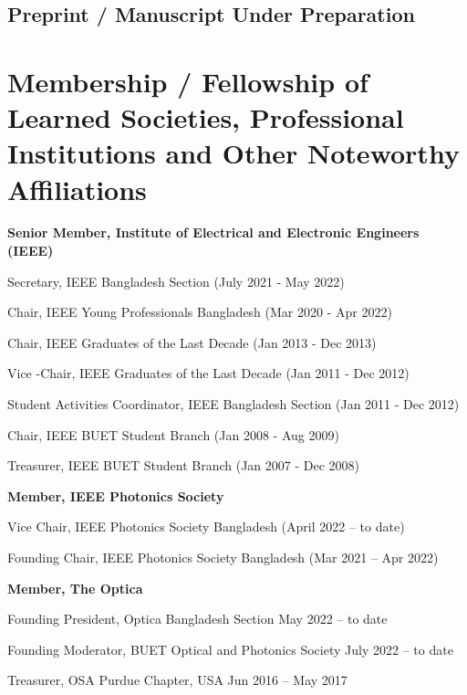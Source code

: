 \documentclass[cvauthor={Dr. Sajid Muhaimin Choudhury}]{buetcv}
\begin{document}
\subsection{Preprint / Manuscript Under Preparation}
\nocite{*}
\newrefcontext[labelprefix=X]
\printbibliography[env=counter,type=unpublished,heading=none]
\printbibliography[type=unpublished,heading=none]


\section{Membership / Fellowship of Learned Societies, Professional Institutions and Other Noteworthy Affiliations}
        \begin{onecolentry}
            \textbf{Senior Member, Institute of Electrical and Electronic Engineers (IEEE)}
            \begin{highlights}
                \item Secretary, IEEE Bangladesh Section (July 2021 - May 2022)
                \item Chair, IEEE Young Professionals Bangladesh	(Mar 2020 - Apr 2022)
                \item Chair, IEEE Graduates of the Last Decade	(Jan 2013 - Dec 2013)
                \item Vice -Chair, IEEE Graduates of the Last Decade	(Jan 2011 - Dec 2012)
                \item Student Activities Coordinator, IEEE Bangladesh Section	(Jan 2011 - Dec 2012)
                \item Chair, IEEE BUET Student Branch	(Jan 2008 - Aug 2009)
                \item Treasurer, IEEE BUET Student Branch	(Jan 2007 - Dec 2008)
            \end{highlights}
        \end{onecolentry}
        \begin{onecolentry}
            \textbf{Member, IEEE Photonics Society}
            \begin{highlights}
                \item Vice Chair, IEEE Photonics Society Bangladesh	(April 2022 – to date)
                \item Founding Chair, IEEE Photonics Society Bangladesh	(Mar 2021 – Apr 2022)
                \end{highlights}
            \end{onecolentry}
            \begin{onecolentry}
                \textbf{Member, The Optica}
                \begin{highlights}
                \item Founding President, Optica Bangladesh Section	May 2022 – to date
                \item Founding Moderator, BUET Optical and Photonics Society 	July 2022 – to date 
                \item Treasurer, OSA Purdue Chapter, USA	Jun 2016 – May 2017
            \end{highlights}
            \end{onecolentry}        
\end{document}
